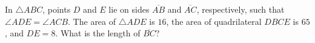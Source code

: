 In $\triangle ABC$, points $D$ and $E$ lie on sides $\overline{AB}$ and $\overline{AC}$, respectively, such that $\angle ADE=\angle ACB$. The area of $\triangle ADE$ is $16$, the area of quadrilateral $DBCE$ is $65$, and $DE=8$. What is the length of $\overline{BC}$?
